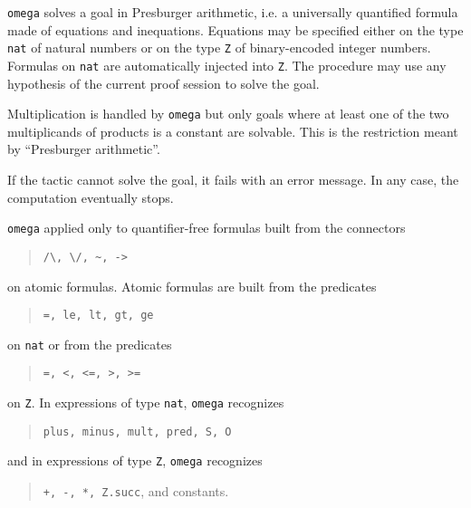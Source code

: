 \label{OmegaChapter}

\label{description}

{\tt omega} solves a goal in Presburger arithmetic, i.e. a universally
quantified formula made of equations and inequations. Equations may
be specified either on the type \verb=nat= of natural numbers or on
the type \verb=Z= of binary-encoded integer numbers. Formulas on
\verb=nat= are automatically injected into \verb=Z=.  The procedure
may use any hypothesis of the current proof session to solve the goal.

Multiplication is handled by {\tt omega} but only goals where at
least one of the two multiplicands of products is a constant are
solvable. This is the restriction meant by ``Presburger arithmetic''.

If the tactic cannot solve the goal, it fails with an error message.
In any case, the computation eventually stops.


{\tt omega} applied only to quantifier-free formulas built from the
connectors

\begin{quote}
\verb=/\, \/, ~, ->=
\end{quote}

on atomic formulas. Atomic formulas are built from the predicates 

\begin{quote}
\verb!=, le, lt, gt, ge!
\end{quote}

 on \verb=nat= or from the predicates

\begin{quote}
\verb!=, <, <=, >, >=!
\end{quote}

 on \verb=Z=. In expressions of type \verb=nat=, {\tt omega} recognizes 

\begin{quote}
\verb!plus, minus, mult, pred, S, O!
\end{quote}

and in expressions of type \verb=Z=, {\tt omega} recognizes 

\begin{quote}
\verb!+, -, *, Z.succ!, and constants.
\end{quote}

